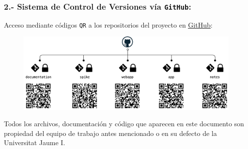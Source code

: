 \documentclass[11pt]{article}
\begin{document}
	\subsubsection*{2.- Sistema de Control de Versiones vía \texttt{GitHub}:}
	Acceso mediante códigos \texttt{QR} a los repositorios del proyecto en \href{https://github.com/proyecto-new}{\underline{GitHub}}:

		\begin{figure}[H]
			\begin{center}
			\includegraphics[scale=0.15]{images/githubdessign.png}
			\end{center}
		\end{figure}

\vfill
\vspace*{\fill}
\hrulefill
\vfill

\vspace{5mm}
\noindent
Todos los archivos, documentación y código que aparecen en este documento son propiedad del equipo de trabajo antes mencionado o en su defecto de la Universitat Jaume I.\\


	\vspace*{\fill}
	\hrulefill
	\doclicenseThis
	\newpage
	\setcounter{page}{1}


\newpage 
\setcounter{page}{1}
\pagestyle{plain}
\tableofcontents	%
\newpage
\listoffigures		%
\vspace*{\fill}
\lstlistoflistings	%
\vspace*{\fill}
\newpage
\listoftables		%



\newpage
\setcounter{page}{1}

\pagestyle{fancy}
\fancyhead[LE,LO]{}





	
\newpage

	
\newpage


\newpage


\newpage


\newpage



\newpage

\end{document}
